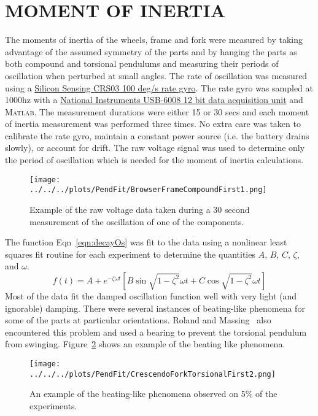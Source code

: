 \documentclass{bmd2010p}
\begin{document}
\section{MOMENT OF INERTIA}
\label{sec:moi}
The moments of inertia of the wheels, frame and fork were measured by taking
advantage of the assumed symmetry of the parts and by hanging the parts as both
compound and torsional pendulums and measuring their periods of oscillation when
perturbed at small angles. The rate of oscillation was measured
using a \href{http://www.siliconsensing.com/CRS03}{Silicon Sensing CRS03 100
deg/s rate gyro}. The rate gyro was sampled at
1000hz with a
\href{http://sine.ni.com/nips/cds/view/p/lang/en/nid/14604}{National
Instruments USB-6008 12 bit data acquisition unit} and
\textsc{Matlab}. The measurement durations were either 15 or 30 secs and each moment of
inertia measurement was performed three times. No extra care was taken to
calibrate the rate gyro, maintain a constant power source (i.e. the battery
drains slowly), or account for drift. The raw voltage signal was used to
determine only the period of oscillation which is needed for the moment of inertia
calculations.
\begin{figure}[tb]
    \begin{center}
        \texttt{[image: ../../../plots/PendFit/BrowserFrameCompoundFirst1.png]}
    \end{center}
    \caption{Example of the raw voltage data taken during a 30 second
    measurement of the oscillation of one of the components.}
    \label{fig:voltage}
\end{figure}
The function Eqn~\ref{eqn:decayOs} was fit to the data using a nonlinear least squares fit
routine for each experiment to determine the quantities $A$, $B$, $C$, $\zeta$,
and $\omega$.
\begin{equation}
    f(t) = A + e^{-\zeta\omega t}\left[B\sin{\sqrt{1-\zeta^2}\omega t} +
    C\cos{\sqrt{1-\zeta^2}\omega t}\right]
    \label{eqn:decayOs}
\end{equation}
Most of the data fit the damped oscillation function well with very light (and
ignorable) damping. There were several instances of beating-like phenomena for
some of the parts at particular orientations. Roland and
Massing~\cite{Roland1971} also encountered this problem and used a bearing to
prevent the torsional pendulum from swinging. Figure~\ref{fig:beating} shows an
example of the beating like phenomena.
\begin{figure}[tpb]
    \begin{center}
        \texttt{[image: ../../../plots/PendFit/CrescendoForkTorsionalFirst2.png]}
    \end{center}
    \caption{An example of the beating-like phenomena observed on 5\% of the
    experiments.}
    \label{fig:beating}
\end{figure}
\end{document}
